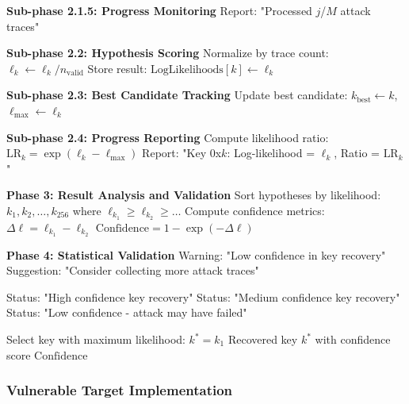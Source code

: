 \documentclass[11pt,a4paper]{article}
\theoremstyle{definition}
\begin{document}
\begin{algorithm}
\begin{algorithmic}[1]
        \STATE \textbf{Sub-phase 2.1.5: Progress Monitoring}
          
            \STATE Report: "Processed $j$/$M$ attack traces"
        \ENDIF
    \ENDFOR
    
    \STATE \textbf{Sub-phase 2.2: Hypothesis Scoring}
    \STATE Normalize by trace count: $\ell_k \leftarrow \ell_k / n_{\text{valid}}$
    \STATE Store result: $\text{LogLikelihoods}[k] \leftarrow \ell_k$
    
    \STATE \textbf{Sub-phase 2.3: Best Candidate Tracking}
        \STATE Update best candidate: $k_{\text{best}} \leftarrow k$, $\ell_{\text{max}} \leftarrow \ell_k$
    \ENDIF
    
    \STATE \textbf{Sub-phase 2.4: Progress Reporting}
        \STATE Compute likelihood ratio: $\text{LR}_k = \exp(\ell_k - \ell_{\text{max}})$
        \STATE Report: "Key 0x$k$: Log-likelihood = $\ell_k$, Ratio = $\text{LR}_k$"
    \ENDIF
\ENDFOR

\STATE \textbf{Phase 3: Result Analysis and Validation}
\STATE Sort hypotheses by likelihood: $k_1, k_2, \ldots, k_{256}$ where $\ell_{k_1} \geq \ell_{k_2} \geq \ldots$
\STATE Compute confidence metrics:
\STATE $\Delta\ell = \ell_{k_1} - \ell_{k_2}$ 
\STATE $\text{Confidence} = 1 - \exp(-\Delta\ell)$ 

\STATE \textbf{Phase 4: Statistical Validation}
  
    \STATE Warning: "Low confidence in key recovery"
    \STATE Suggestion: "Consider collecting more attack traces"
\ENDIF

    \STATE Status: "High confidence key recovery"
    \STATE Status: "Medium confidence key recovery"
\ELSE
    \STATE Status: "Low confidence - attack may have failed"
\ENDIF

\STATE Select key with maximum likelihood: $k^* = k_1$
\RETURN Recovered key $k^*$ with confidence score $\text{Confidence}$
\end{algorithmic}
\end{algorithm}

\subsubsection{Vulnerable Target Implementation}
\end{document}
